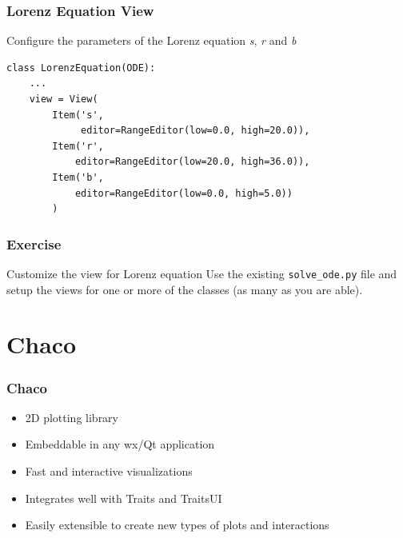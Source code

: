\documentclass[14pt,compress]{beamer}
\newcommand{\typ}[1]{\lstinline{#1}}
\begin{document}
\begin{frame}
\frametitle{Lorenz Equation View}
Configure the parameters of the Lorenz equation \emph{s}, \emph{r} and \emph{b}
\footnotesize
\begin{lstlisting}
class LorenzEquation(ODE):
    ...
    view = View(
        Item('s', 
             editor=RangeEditor(low=0.0, high=20.0)),
        Item('r', 
            editor=RangeEditor(low=20.0, high=36.0)),
        Item('b', 
            editor=RangeEditor(low=0.0, high=5.0))
        )
\end{lstlisting}
\end{frame}


\begin{frame}[plain]
    \frametitle{Exercise}
  \begin{block}{Customize the view for Lorenz equation}
  Use the existing \typ{solve_ode.py} file and setup the views for one
  or more of the classes (as many as you are able).
 \end{block}
\end{frame}


\section{Chaco}

\begin{frame}
  \frametitle{Chaco}
  \begin{itemize}
      \item 2D plotting library
      \item Embeddable in any wx/Qt application
      \item Fast and interactive visualizations
      \item Integrates well with Traits and TraitsUI
      \item Easily extensible to create new types of plots and interactions
  \end{itemize}
\end{frame}
\end{document}
